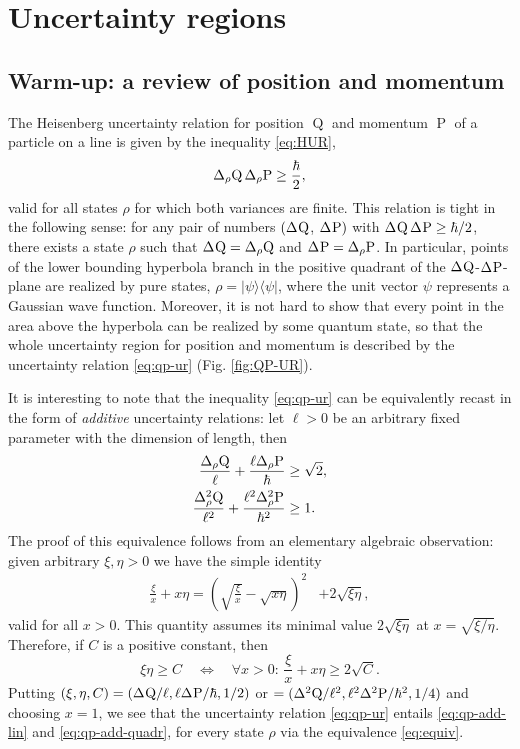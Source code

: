 \section{Uncertainty regions}

\subsection{Warm-up: a review of position and momentum}\label{sec:qp}

The Heisenberg uncertainty relation for position $\operatorname{Q}$ and momentum $\operatorname{P}$ of a particle on a line is given by the inequality \eqref{eq:HUR},
\begin{equation}\label{eq:qp-ur}
  \sdevr{\opq}\,\sdevr{\opp}\ge\frac{\hbar}{2},
\end{equation}
valid for all states $\rho$ for which both variances are finite. This relation
is tight  in the following sense: for any pair of numbers $(\sdev{\opq}$, $\sdev{\opp})$ with $\sdev{\opq}\,\sdev{\opp}\ge \hbar/2$, there exists a state $\rho$ such that $\sdev{\opq} =\sdevr{\opq}$ and $\sdev{\opp}=\sdevr{\opp}$.  In particular, points of the lower bounding hyperbola branch in the positive quadrant of the $\sdev{\opq}$-$\sdev{\opp}$-plane are realized by pure states, $\rho=|\psi\rangle\langle\psi|$, where the unit vector $\psi$ represents a Gaussian wave function. Moreover, it is not hard to show that every point in the area above the hyperbola can be realized by some quantum state, so that the whole uncertainty region for position and momentum is described by the uncertainty relation \eqref{eq:qp-ur} (Fig. \ref{fig:QP-UR}).

It is interesting to note that the inequality \eqref{eq:qp-ur}  can be equivalently recast  in the form of {\em additive} uncertainty relations: let $\ell>0$ be an arbitrary fixed parameter with the  dimension of length, then
\begin{align}
  \frac{\sdevr{\opq}}{\ell}+\frac{\ell\sdevr{\opp}}{\hbar}&\ge \sqrt2,\label{eq:qp-add-lin}\\
  \frac{\varr{\opq}}{\ell^2}+\frac{\ell^2\varr{\opp}}{\hbar^2}&\ge 1.\label{eq:qp-add-quadr}
\end{align}
The proof of this equivalence follows from an elementary algebraic observation: given arbitrary $\xi,\eta>0$ we have the simple identity
\begin{align}%
  \frac \xi x+x \eta=\left(\sqrt{\frac \xi x}-\sqrt{x \eta}\right)^2&+2\sqrt{\xi \eta},
\end{align}
valid for all $x>0$. This quantity assumes its  minimal value $2\sqrt{\xi \eta}$ at $x=\sqrt{\xi/ \eta}$. Therefore, if $C$ is a positive constant, then
\begin{equation}\label{eq:equiv}
  \xi\eta\ge C\quad\iff\quad\forall x>0:\,\frac\xi x+x\eta\ge 2\sqrt{C}.
\end{equation}
Putting
$(\xi,\eta,C)= (\sdev{\opq}/\ell,\ell\sdev{\opp}/\hbar,1/2)$ or $=(\var{\opq}/\ell^2,\ell^2\var{\opp}/\hbar^2,1/4)$ and choosing $x=1$, we see that the uncertainty relation \eqref{eq:qp-ur} entails  \eqref{eq:qp-add-lin} and \eqref{eq:qp-add-quadr}, for every state $\rho$ via the equivalence \eqref{eq:equiv}.


